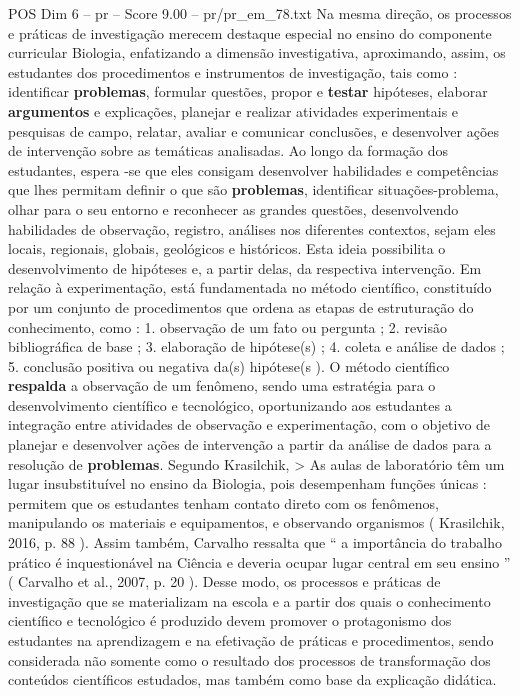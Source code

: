 \begin{textsample}{POS Dim 6 – pr – Score 9.00 – pr/pr\_em\_78.txt}
Na mesma direção, os processos e práticas de investigação merecem destaque especial no ensino do componente curricular Biologia, enfatizando a dimensão investigativa, aproximando, assim, os estudantes dos procedimentos e instrumentos de investigação, tais como : identificar \textbf{problemas}, formular questões, propor e \textbf{testar} hipóteses, elaborar \textbf{argumentos} e explicações, planejar e realizar atividades experimentais e pesquisas de campo, relatar, avaliar e comunicar conclusões, e desenvolver ações de intervenção sobre as temáticas analisadas.
Ao longo da formação dos estudantes, espera -se que eles consigam desenvolver habilidades e competências que lhes permitam definir o que são \textbf{problemas}, identificar situações-problema, olhar para o seu entorno e reconhecer as grandes questões, desenvolvendo habilidades de observação, registro, análises nos diferentes contextos, sejam eles locais, regionais, globais, geológicos e históricos.
Esta ideia possibilita o desenvolvimento de hipóteses e, a partir delas, da respectiva intervenção.
Em relação à experimentação, está fundamentada no método científico, constituído por um conjunto de procedimentos que ordena as etapas de estruturação do conhecimento, como : 1. observação de um fato ou pergunta ; 2. revisão bibliográfica de base ; 3. elaboração de hipótese(s) ; 4. coleta e análise de dados ; 5. conclusão positiva ou negativa da(s) hipótese(s ).
O método científico \textbf{respalda} a observação de um fenômeno, sendo uma estratégia para o desenvolvimento científico e tecnológico, oportunizando aos estudantes a integração entre atividades de observação e experimentação, com o objetivo de planejar e desenvolver ações de intervenção a partir da análise de dados para a resolução de \textbf{problemas}.
Segundo Krasilchik, > As aulas de laboratório têm um lugar insubstituível no ensino da Biologia, pois desempenham funções únicas : permitem que os estudantes tenham contato direto com os fenômenos, manipulando os materiais e equipamentos, e observando organismos ( Krasilchik, 2016, p. 88 ).
Assim também, Carvalho ressalta que “ a importância do trabalho prático é inquestionável na Ciência e deveria ocupar lugar central em seu ensino ” ( Carvalho et al., 2007, p. 20 ).
Desse modo, os processos e práticas de investigação que se materializam na escola e a partir dos quais o conhecimento científico e tecnológico é produzido devem promover o protagonismo dos estudantes na aprendizagem e na efetivação de práticas e procedimentos, sendo considerada não somente como o resultado dos processos de transformação dos conteúdos científicos estudados, mas também como base da explicação didática.

\end{textsample}
